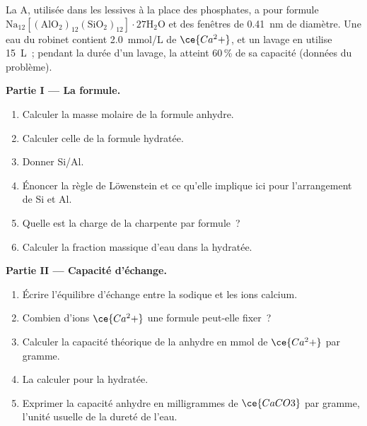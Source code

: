 \begin{problem}
\label{pb:b3:inorganic-materials:1}
La  A, utilisée dans les lessives à la place des phosphates, a pour formule
$\mathrm{Na_{12}[(AlO_2)_{12}(SiO_2)_{12}]\cdot 27H_2O}$ et des fenêtres de \qty{0.41}{nm} de diamètre. Une eau du robinet contient
\qty{2.0}{mmol/L} de $\ce{Ca^2+}$, et un lavage en utilise \qty{15}{L}~; pendant la durée d'un lavage, la 
atteint 60\,\% de sa capacité (données du problème).

\medskip\noindent\textbf{Partie I --- La formule.}
\begin{enumerate}
  \item Calculer la masse molaire de la formule anhydre.
  \item Calculer celle de la formule hydratée.
  \item Donner Si/Al.
  \item Énoncer la règle de Löwenstein et ce qu'elle implique ici pour
        l'arrangement de Si et Al.
  \item Quelle est la charge de la charpente par formule~?
  \item Calculer la fraction massique d'eau dans la  hydratée.
\end{enumerate}

\medskip\noindent\textbf{Partie II --- Capacité d'échange.}
\begin{enumerate}[resume]
  \item Écrire l'équilibre d'échange entre la  sodique et les ions
        calcium.
  \item Combien d'ions $\ce{Ca^2+}$ une formule peut-elle fixer~?
  \item Calculer la capacité théorique de la  anhydre en mmol de $\ce{Ca^2+}$
        par gramme.
  \item La calculer pour la  hydratée.
  \item Exprimer la capacité anhydre en milligrammes de $\ce{CaCO3}$ par gramme, l'unité
        usuelle de la dureté de l'eau.
\end{enumerate}


\end{problem}
